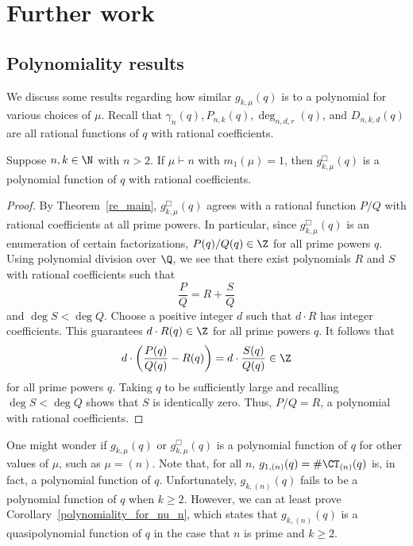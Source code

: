 \section{Further work}
\label{outro}

\subsection{Polynomiality results}

We discuss some results regarding how similar \(g_{k,\mu}(q)\) is to a polynomial for various choices of \(\mu\).
Recall that \(\gamma_n (q), P_{n,k} (q), \deg_{n,d,r} (q)\), and \(D_{n,k,d} (q)\) are all rational functions of \(q\) with rational coefficients.

\begin{corollary}
\label{full_polynomiality_for_some}
Suppose \(n, k \in \N\) with \(n > 2\).
If \(\mu \vdash n\) with \(m_1(\mu) = 1\), then \(g_{k,\mu}^\Box (q)\) is a polynomial function of \(q\) with rational coefficients.
\end{corollary}

\begin{proof}
By Theorem~\ref{re_main}, \(g^\Box_{k,\mu} (q)\) agrees with a rational function \(P / Q\) with rational coefficients at all prime powers.
In particular, since \(g^\Box_{k,\mu} (q)\) is an enumeration of certain factorizations, \(P(q) / Q(q) \in \Z\) for all prime powers \(q\).
Using polynomial division over \(\Q\),
we see that there exist polynomials \(R\) and \(S\) with rational coefficients such that
\begin{equation}
	\label{rational_fractional_etc}
	\frac{P}{Q} = R + \frac{S}{Q}
\end{equation}
and \(\deg S < \deg Q\).
Choose a positive integer \(d\) such that \(d \cdot R\) has integer coefficients.
This guarantees \(d \cdot R(q) \in \Z\) for all prime powers \(q\).
It follows that
\begin{equation}
	d \cdot \left ( \frac{P(q)}{Q(q)} - R(q) \right ) = d \cdot \frac{S(q)}{Q(q)} \in \Z
\end{equation}
for all prime powers \(q\).
Taking \(q\) to be sufficiently large and recalling \(\deg S < \deg Q\) shows that \(S\) is identically zero.
Thus, \(P/Q = R\), a polynomial with rational coefficients.
\end{proof}

One might wonder if \(g_{k,\mu} (q)\) or \(g^\Box_{k,\mu} (q)\) is a polynomial function of \(q\) for other values of \(\mu\), such as \(\mu = (n)\).
Note that, for all \(n\), \(g_{1,(n)} (q) = \# \CT_{(n)} (q)\) is, in fact, a polynomial function of \(q\).
Unfortunately, \(g_{k,(n)}(q)\) fails to be a polynomial function of \(q\) when \(k \geq 2\).
However, we can at least prove Corollary~\ref{polynomiality_for_nu_n}, which states that \(g_{k,(n)} (q)\) is a quasipolynomial function of \(q\) in the case that \(n\) is prime and \(k \geq 2\).

